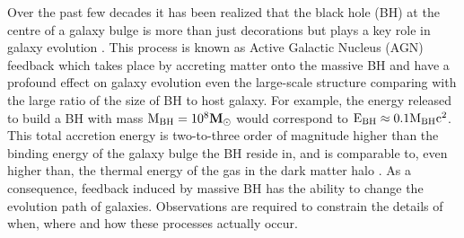 \documentclass[../main.tex]{subfiles}
\begin{document}
Over the past few decades it has been realized that the black hole (BH) at the centre of a galaxy bulge is more than just decorations but plays a key role in galaxy evolution \citep{fabian4114observational}. 
This process is known as Active Galactic Nucleus (AGN) feedback which takes place by accreting matter onto the massive BH and have a profound effect on galaxy evolution even the large-scale structure comparing with the large ratio of the size of BH to host galaxy.
For example, the energy released to build a BH with mass $\rm M_{BH}=10^{8} \mathbf{M}_{\odot}$ would correspond to $\rm E_{BH} \approx 0.1M_{BH}c^{2}$. This total accretion energy is two-to-three order of magnitude higher than the binding energy of the galaxy bulge the BH reside in, and is comparable to, even higher than, the thermal energy of the gas in the dark matter halo \citep{harrison2016observational}. As a consequence, feedback induced by massive BH has the ability to change the evolution path of galaxies. Observations are required to constrain the details of when, where and how these processes actually occur.
\end{document}
